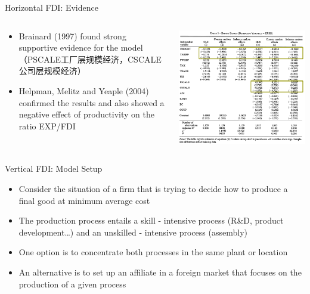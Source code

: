 \documentclass[10pt,hyperref={CJKbookmarks=true},xcolor=dvipsnames,aspectratio=169]{beamer}
\begin{document}
\begin{frame}{Horizontal FDI: Evidence}


\begin{columns}[onlytextwidth]
\begin{column}{0.5\textwidth}
\begin{itemize}
\item Brainard (1997) found strong supportive evidence for the model （PSCALE工厂层规模经济，CSCALE公司层规模经济）
\item Helpman, Melitz and Yeaple (2004) confirmed the results and also showed
a negative effect of productivity on the ratio EXP/FDI 
\end{itemize}

\end{column}
\begin{column}{0.5\textwidth}
\includegraphics[width=\columnwidth]{fig/fdi/lec7-6}
\end{column}
\end{columns}

\end{frame}

\begin{frame}{Vertical FDI: Model Setup }

\begin{itemize}
\item Consider the situation of a firm that is trying to decide how to produce
a final good at minimum average cost 
\item The production process entails a skill - intensive process (R\&D,
product development…) and an unskilled - intensive process (assembly) 
\item One option is to concentrate both processes in the same plant or location 
\item An alternative is to set up an affiliate in a foreign market that
focuses on the production of a given process 
\end{itemize}
\end{frame}
\end{document}
